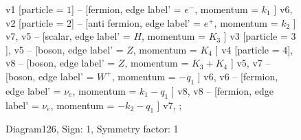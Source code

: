 \documentclass{revtex4}
\begin{document}
\begin{figure}[!htb]
\begin{center}
{    %
v1 [particle = \(1\)] -- [fermion, edge label' = \(e^{-}\), momentum = \(k_{1}\) ] v6, 
v2 [particle = \(2\)] -- [anti fermion, edge label' = \(e^{+}\), momentum = \(k_{2}\) ] v7, 
v5 -- [scalar, edge label' = \(H\), momentum = \(K_{3}\) ] v3 [particle = \(3\)], 
v5 -- [boson, edge label' = \(Z\), momentum = \(K_{4}\) ] v4 [particle = \(4\)], 
v8 -- [boson, edge label' = \(Z\), momentum = \(K_{3} + K_{4}\) ] v5, 
v7 -- [boson, edge label' = \(W^{+}\), momentum = \(-q_{1}\) ] v6, 
v6 -- [fermion, edge label' = \(\nu_{e}\), momentum = \(k_{1} - q_{1}\) ] v8, 
v8 -- [fermion, edge label' = \(\nu_{e}\), momentum = \(-k_{2} - q_{1}\) ] v7, 
};
\end{center}
\caption{Diagram126, Sign: 1, Symmetry factor: 1}
\end{figure}
\newpage
\end{document}
